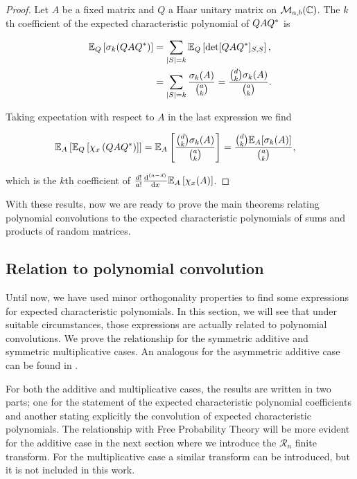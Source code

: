 \begin{proof}
    Let $A$ be a fixed matrix and $Q$ a Haar unitary matrix on $\mathcal M_{a,b}(\mathbb C)$. The $k$th coefficient of the expected characteristic polynomial of $QAQ^*$ is 

    \begin{align*}
        \mathbb E_Q \left[ \sigma_k(QAQ^*) \right] &= \sum_{\lvert S \rvert = k} \mathbb E_Q\left[ \det [QAQ^*]_{S,S} \right],\\ 
        &= \sum_{\lvert S \rvert = k} \frac{\sigma_k(A)}{\binom ak} = \frac{\binom{d}{k} \sigma_k(A)}{\binom{a}{k}}.
    \end{align*}

    Taking expectation with respect to $A$ in the last expression we find

    \begin{align*}
        \mathbb E_A \left[\mathbb E_Q\left[ \chi_x \left( Q A Q^* \right) \right]\right] &= \mathbb E_A \left[ \frac{\binom{d}{k} \sigma_k(A)}{\binom{a}{k}} \right] = \frac{\binom{d}{k} \mathbb E_A[\sigma_k(A)]}{\binom{a}{k}},
    \end{align*}

    \noindent which is the $k$th coefficient of $\frac{d!}{a!} \frac{\mathrm d^{(a-d)}}{\mathrm d x} \mathbb E_A \left[\chi_x(A) \right]$.
\end{proof}

With these results, now we are ready to prove the main theorems relating polynomial convolutions to the expected characteristic polynomials of sums and products of random matrices.

\subsection{Relation to polynomial convolution}

Until now, we have used minor orthogonality properties to find some expressions for expected characteristic polynomials. In this section, we will see that under suitable circumstances, those expressions are actually related to polynomial convolutions. We prove the relationship for the symmetric additive and symmetric multiplicative cases. An analogous for the asymmetric additive case can be found in \cite{article:finitefree}. %

For both the additive and multiplicative cases, the results are written in two parts; one for the statement of the expected characteristic polynomial coefficients and another stating explicitly the convolution of expected characteristic polynomials. The relationship with Free Probability Theory will be more evident for the additive case in the next section where we introduce the $\mathcal R_n$ finite transform. For the multiplicative case a similar transform can be introduced, but it is not included in this work. 

